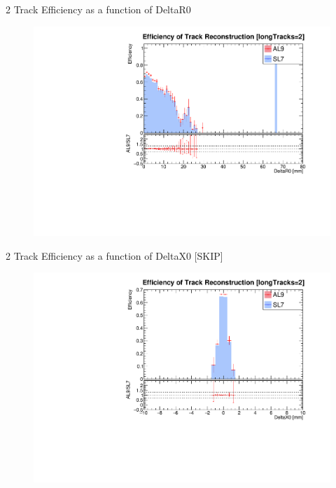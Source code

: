 \begin{frame}{2 Track Efficiency as a function of DeltaR0}
    \begin{figure}
        \includegraphics[width=\linewidth]{./output/Effi_eq2_DeltaR0.pdf}
    \end{figure}
\end{frame}
\begin{frame}{2 Track Efficiency as a function of DeltaX0 [SKIP]}
    \begin{figure}
        \includegraphics[width=\linewidth]{./output/Effi_eq2_DeltaX0.pdf}

    \end{figure}
\end{frame}
